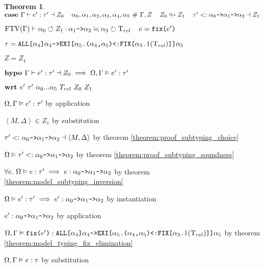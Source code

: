 \documentclass[acmsmall]{acmart}
\theoremstyle{definition}
\newtheorem{theorem}{Theorem}[section]
\begin{document}
\begin{theorem}
  \item \Z $\B{case } 
    \Gamma \entails e' \hastype \tau' \given Z_0
    \I
    \alpha_0, \alpha_1, \alpha_2, \alpha_3, \alpha_4, \alpha_5\ \#\ \Gamma, Z
    \I
    Z_0 \looparrowright Z_1
    \I
    \tau' \subtypes \code{$\alpha_0$->$\alpha_1$->$\alpha_2$} \given Z_1
  $ 
  \item \Z $
    \text{FTV}(\Gamma) \vdash \alpha_0 \circlearrowleft Z_1 \cdot \texttt{$\alpha_1$->$\alpha_2$} \fallingdotseq \alpha_3 \circlearrowright \mathrm{T}_{rel}
    \hspace{4mm}
    e = \texttt{fix($e'$)}
  $
  \item \Z $
    \tau = \texttt{ALL[$\alpha_4$]$\alpha_4$->EXI[$\alpha_5$.($\alpha_4$,$\alpha_5$)<:FIX[$\alpha_3$.|$(\mathrm{T}_{rel})$]]$\alpha_5$}
  $
  \item \Z $
    Z = Z_1 
  $
  \item \Z $\textbf{hypo } 
    \Gamma \vdash e' : \tau' \dashv Z_0 
    \implies
    \Omega, \Gamma \vDash e' : \tau'
  $ 
  \item \Z $\B{wrt } e'\ \tau'\ \alpha_0 ... \alpha_5\ T_{rel}\ Z_0\ Z_1 $ 
  \item \Z\Z $
    \Omega, \Gamma \vDash e' : \tau'
  $ by application
  \item \Z\Z $
    \left< M, \Delta \right> \in Z_1 
  $ by substitution 
  \item \Z\Z $
    \tau' <: \texttt{$\alpha_0$->$\alpha_1$->$\alpha_2$} \dashv \left< M, \Delta \right> 
  $ by theorem \ref{theorem:proof_subtyping_choice}
  \item \Z\Z $
    \Omega \vDash \tau' <: \texttt{$\alpha_0$->$\alpha_1$->$\alpha_2$}
  $ by theorem \ref{theorem:proof_subtyping_soundness}
  \item \Z\Z $
    \forall e .\ \Omega \vDash e : \tau' \implies e : \texttt{$\alpha_0$->$\alpha_1$->$\alpha_2$}
  $ by theorem \ref{theorem:model_subtyping_inversion}
  \item \Z\Z $
   \Omega \vDash e' : \tau' \implies e' : \texttt{$\alpha_0$->$\alpha_1$->$\alpha_2$}
  $ by instantiation 
  \item \Z\Z $
   e' : \texttt{$\alpha_0$->$\alpha_1$->$\alpha_2$}
  $ by application 
  \item \Z\Z $
    \Omega, \Gamma \vDash \texttt{fix($e'$)} : \texttt{ALL[$\alpha_4$]$\alpha_4$->EXI[$\alpha_5$.($\alpha_4$,$\alpha_5$)<:FIX[$\alpha_3$.|$(\mathrm{T}_{rel})$]]$\alpha_5$} 
  $ by theorem \ref{theorem:model_typing_fix_elimination} 
  \item \Z\Z $
    \Omega, \Gamma \vDash e : \tau
  $ by substitution 


\end{theorem}
\end{document}
